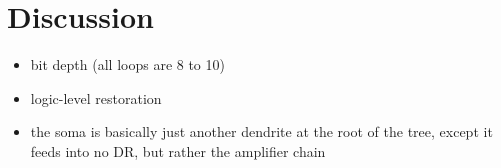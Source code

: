 \documentclass[twocolumn]{article}
\begin{document}
\begin{figure} 
\end{figure}

\section{\label{sec:discussion}Discussion}
\begin{itemize}
\item bit depth (all loops are 8 to 10)
\item logic-level restoration
\item the soma is basically just another dendrite at the root of the tree, except it feeds into no DR, but rather the amplifier chain
\end{itemize}	
\newpage
\appendix



\end{document}
